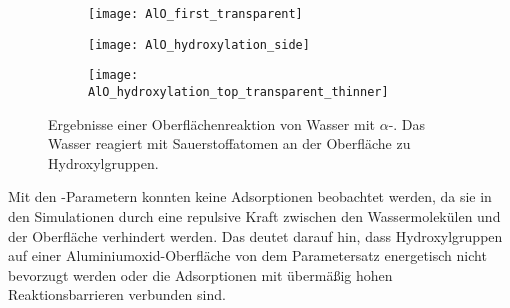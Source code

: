\begin{figure}[t]
  \centering
  \captionsetup[subfigure]{singlelinecheck=false}

  \begin{subfigure}[c]{7.5cm}
    \begin{framed}
      \hspace{0.5em}
      \hspace{0.5em}
      \hspace{0.5em}
    \end{framed}
  \end{subfigure}

  \vspace{1em}

  \def\subfigwidth{0.32\textwidth}
  \begin{subfigure}[t]{\subfigwidth}
    \texttt{[image: AlO\_first\_transparent]}
    \label{fig:wateraluminasurface-a}
  \end{subfigure}
  \hfill
  \begin{subfigure}[t]{\subfigwidth}
    \texttt{[image: AlO\_hydroxylation\_side]}
    \label{fig:wateraluminasurface-b}
  \end{subfigure}
  \hfill
  \begin{subfigure}[t]{\subfigwidth}
    \texttt{[image: AlO\_hydroxylation\_top\_transparent\_thinner]}
    \label{fig:wateraluminasurface-c}
  \end{subfigure}
  \caption[Oberflächenreaktion von Wasser mit $\alpha$-]{Ergebnisse einer Oberflächenreaktion von Wasser mit $\alpha$-.
    Das Wasser reagiert mit Sauerstoffatomen an der Oberfläche zu Hydroxylgruppen.
  }
  \label{fig:wateraluminasurface}
\end{figure}

Mit den -Parametern konnten keine Adsorptionen beobachtet werden, da sie in den Simulationen durch eine repulsive Kraft zwischen den Wassermolekülen und der Oberfläche verhindert werden.
Das deutet darauf hin, dass Hydroxylgruppen auf einer Aluminiumoxid-Oberfläche von dem Parametersatz energetisch nicht bevorzugt werden oder die Adsorptionen mit übermäßig hohen Reaktionsbarrieren verbunden sind.

